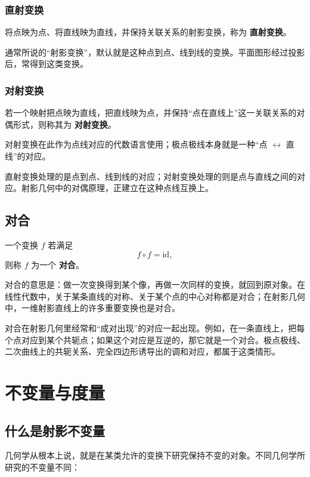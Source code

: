 \subsection{直射变换}
\begin{definition}
将点映为点、将直线映为直线，并保持关联关系的射影变换，称为 \textbf{直射变换}。
\end{definition}

通常所说的“射影变换”，默认就是这种点到点、线到线的变换。平面图形经过投影后，常得到这类变换。

\subsection{对射变换}
\begin{definition}
若一个映射把点映为直线，把直线映为点，并保持“点在直线上”这一关联关系的对偶形式，则称其为 \textbf{对射变换}。
\end{definition}

对射变换在此作为点线对应的代数语言使用；极点极线本身就是一种“点 $\leftrightarrow$ 直线”的对应。

直射变换处理的是点到点、线到线的对应；对射变换处理的则是点与直线之间的对应。射影几何中的对偶原理，正建立在这种点线互换上。

\section{对合}
\begin{definition}
一个变换 $f$ 若满足
\[
f\circ f=\mathrm{id},
\]
则称 $f$ 为一个 \textbf{对合}。
\end{definition}

对合的意思是：做一次变换得到某个像，再做一次同样的变换，就回到原对象。在线性代数中，关于某条直线的对称、关于某个点的中心对称都是对合；在射影几何中，一维射影直线上的许多重要变换也是对合。

对合在射影几何里经常和“成对出现”的对应一起出现。例如，在一条直线上，把每个点对应到某个共轭点；如果这个对应是互逆的，那它就是一个对合。极点极线、二次曲线上的共轭关系、完全四边形诱导出的调和对应，都属于这类情形。

\chapter{不变量与度量}

\section{什么是射影不变量}
几何学从根本上说，就是在某类允许的变换下研究保持不变的对象。不同几何学所研究的不变量不同：

